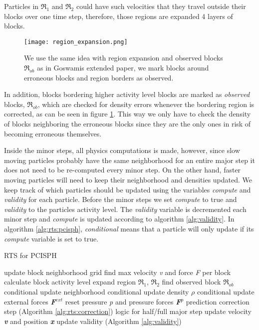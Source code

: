 \documentclass[../../main.tex]{subfiles}
\begin{document}
Particles in $\Re_1$ and $\Re_2$ could have such velocities that they travel outside their blocks over one time step, therefore, those regions are expanded 4 layers of blocks.

\begin{figure}[h!]
    \centering
    \texttt{[image: region\_expansion.png]}
    \caption[Region expansion for $R_x$]{ We use the same idea with region expansion and observed blocks $\Re_{ob}$ as in Goswamis extended paper, we mark blocks around erroneous blocks and region borders as observed. }
    \label{fig:region_exp}
\end{figure}

In addition, blocks bordering higher activity level blocks are marked as \textit{observed} blocks, $\Re_{ob}$, which are checked for density errors whenever the bordering region is corrected, as can be seen in figure \ref{fig:region_exp}. This way we only have to check the density of blocks neighboring the erroneous blocks since they are the only ones in risk of becoming erroneous themselves. 

Inside the minor steps, all physics computations is made, however, since slow moving particles probably have the same neighborhood for an entire major step it does not need to be re-computed every minor step. On the other hand, faster moving particles will need to keep their neighborhood and densities updated. We keep track of which particles should be updated using the variables \textit{compute} and \textit{validity} for each particle. Before the minor steps we set \textit{compute} to true and \textit{validity} to the particles activity level. The \textit{validity} variable is decremented each minor step and \textit{compute} is updated according to algorithm \ref{alg:validity}. In algorithm \ref{alg:rts:pcisph}, \textit{conditional} means that a particle will only update if its \textit{compute} variable is set to true. 

\begin{algorithm}[]
    \caption{RTS for PCISPH}
    \label{alg:rts:pcisph}
    \begin{algorithmic}[1]
            \State update block neighborhood grid
            \State find max velocity \textit{v} and force \textit{F} per block
            \State calculate block activity level
            \State expand region $\Re_1$, $\Re_2$
            \State find observed block $\Re_{ob}$
                \State conditional update neighborhood
                \State conditional update density $\rho$
                \State conditional update external forces \textbf{\textit{F}}$^{ext}$
                \State reset pressure \textit{p} and pressure forces \textbf{\textit{F}}$^p$
                \State prediction correction step (Algorithm \ref{alg:rts:correction})
                \State logic for half/full major step
                \State update velocity \textbf{\textit{v}} and position \textbf{\textit{x}}
                \State update validity (Algorithm \ref{alg:validity})
            \EndFor
        \EndWhile
   \end{algorithmic}
\end{algorithm}
\end{document}

